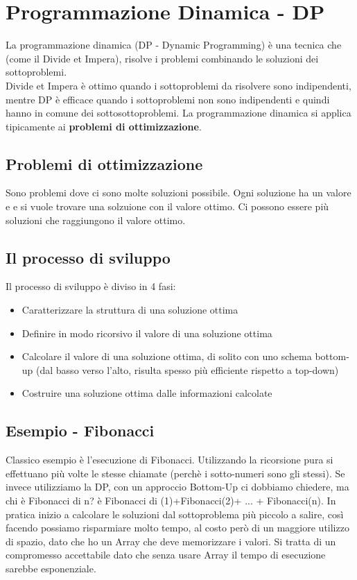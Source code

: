 \chapter{Programmazione Dinamica - DP}
La programmazione dinamica (DP - Dynamic Programming) è una tecnica che (come il Divide et Impera),
risolve i problemi combinando le soluzioni dei sottoproblemi.\\
Divide et Impera è ottimo quando i sottoproblemi da risolvere sono indipendenti,
mentre DP è efficace quando i sottoproblemi non sono indipendenti e quindi hanno in comune
dei sottosottoproblemi. La programmazione dinamica si applica tipicamente ai \textbf{problemi di ottimizzazione}.
\section{Problemi di ottimizzazione}
Sono problemi dove ci sono molte soluzioni possibile. Ogni soluzione ha un valore e e si vuole trovare una solzuione
con il valore  ottimo. Ci possono essere più soluzioni che raggiungono il valore ottimo.
\section{Il processo di sviluppo}
Il processo di sviluppo è diviso in 4 fasi:
\begin{itemize}
    \item Caratterizzare la struttura di una soluzione ottima
    \item Definire in modo ricorsivo il valore di una soluzione ottima
    \item Calcolare il valore di una soluzione ottima, di solito con uno schema bottom-up (dal basso verso
    l'alto, risulta spesso più efficiente rispetto a top-down)
    \item Costruire una soluzione ottima dalle informazioni calcolate
\end{itemize}
\section{Esempio - Fibonacci}
Classico esempio è l'esecuzione di Fibonacci. Utilizzando la ricorsione pura
si effettuano più volte le stesse chiamate (perchè i sotto-numeri sono gli stessi). Se invece
utilizziamo la DP, con un approccio Bottom-Up ci dobbiamo chiedere,
ma chi è Fibonacci di n? è Fibonacci di (1)+Fibonacci(2)+ ... + Fibonacci(n). In pratica
inizio a calcolare le soluzioni dal sottoproblema più piccolo a salire, così facendo possiamo risparmiare molto tempo,
al costo però di un maggiore utilizzo di spazio, dato che ho un Array che deve memorizzare i valori. Si tratta 
di un compromesso accettabile dato che senza usare Array il tempo di esecuzione sarebbe esponenziale.

